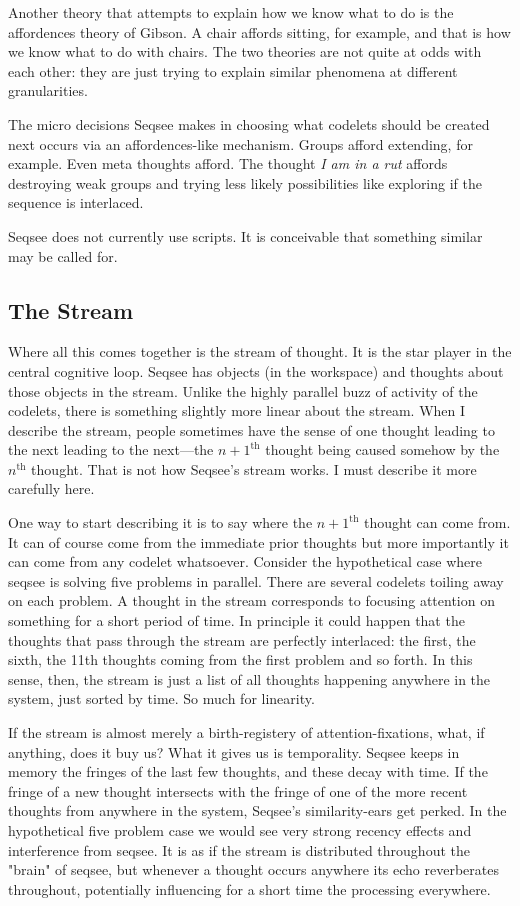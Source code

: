  Another theory that attempts to explain how we know what to do is the affordences theory of Gibson. A chair affords sitting, for example, and that is how we know what to do with chairs.  The two theories are not quite at odds with each other: they are just trying to explain similar phenomena at different granularities.

The micro decisions Seqsee makes in choosing what codelets should be created next occurs via an affordences-like mechanism. Groups afford extending, for example.  Even meta thoughts afford.  The thought \emph{I am in a rut} affords destroying weak groups and trying less likely possibilities like exploring if the sequence is interlaced.

Seqsee does not currently use scripts.  It is conceivable that something similar may be called for. 

\subsection{The Stream}
\label{sec:stream}

Where all this comes together is the stream of thought.  It is the star player in the central cognitive loop.  Seqsee has objects (in the workspace) and thoughts about those objects in the stream.  Unlike the highly parallel buzz of activity of the codelets, there is something slightly more linear about the stream.  When I describe the stream, people sometimes have the sense of one thought leading to the next leading to the next---the $n+1^{\mathrm{th}}$ thought being caused somehow by the $n^\mathrm{th}$ thought.  That is not how Seqsee's stream works.  I must describe it more carefully here.

One way to start describing it is to say where the $n+1^{\mathrm{th}}$ thought can come from.  It can of course come  from the immediate prior thoughts but more importantly it can come from any codelet whatsoever.  Consider the hypothetical case where seqsee is solving five problems in parallel.  There are several codelets toiling away on each problem.  A thought in the stream corresponds to focusing attention on something for a short period of time.  In principle it could happen that the thoughts that pass through the stream are perfectly interlaced: the first, the sixth, the 11th thoughts coming from the first problem and so forth.  In this sense, then, the stream is just a list of all thoughts happening anywhere in the system, just sorted by time.  So much for linearity.

If the stream is almost merely a birth-registery of attention-fixations, what, if anything, does it buy us? What it gives us is temporality.  Seqsee keeps in memory the fringes of the last few thoughts, and these decay with time.  If the fringe of a new thought intersects with the fringe of one of the more recent thoughts from anywhere in the system, Seqsee's similarity-ears get perked.  In the hypothetical five problem case we would see very strong recency effects and interference from seqsee.  It is as if the stream is distributed throughout the "brain" of seqsee, but whenever a thought occurs anywhere its echo reverberates throughout, potentially influencing for a short time the processing everywhere.

